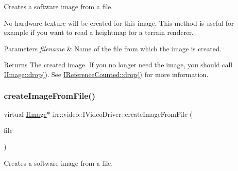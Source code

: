 Creates a software image from a file. 

No hardware texture will be created for this image. This method is useful for example if you want to read a heightmap for a terrain renderer. 
\begin{DoxyParams}{Parameters}
{\em filename} & Name of the file from which the image is created. \\
\hline
\end{DoxyParams}
\begin{DoxyReturn}{Returns}
The created image. If you no longer need the image, you should call \hyperlink{classirr_1_1IReferenceCounted_a03856a09355b89d178090c4a5f738543}{I\+Image\+::drop()}. See \hyperlink{classirr_1_1IReferenceCounted_a03856a09355b89d178090c4a5f738543}{I\+Reference\+Counted\+::drop()} for more information. 
\end{DoxyReturn}
\mbox{\label{classirr_1_1video_1_1IVideoDriver_a322c41fa08c1da9de4633cf8a1e68607}} 
\subsubsection{\texorpdfstring{create\+Image\+From\+File()}{createImageFromFile()}\hspace{0.1cm}{\footnotesize\ttfamily [2/2]}}
{\footnotesize\ttfamily virtual \hyperlink{classirr_1_1video_1_1IImage}{I\+Image}$\ast$ irr\+::video\+::\+I\+Video\+Driver\+::create\+Image\+From\+File (\begin{DoxyParamCaption}\item[{\hyperlink{classirr_1_1io_1_1IReadFile}{io\+::\+I\+Read\+File} $\ast$}]{file }\end{DoxyParamCaption})\hspace{0.3cm}{\ttfamily [pure virtual]}}



Creates a software image from a file. 

